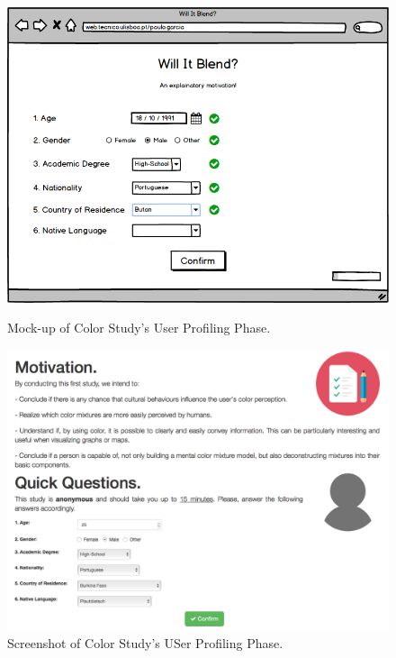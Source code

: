 \begin{figure}[htbp]
  \centering
  \begin{minipage}{0.4\textwidth}
		\centering
	  \includegraphics[width=\textwidth]{images/implementation/mockup_profiling.png}
	  \caption[Mock-up of Color Study's User Profiling Phase.]{Mock-up of Color Study's User Profiling Phase.}
	  \label{fig:mockup_profiling}
  \end{minipage}\hfill
  \begin{minipage}{0.4\textwidth}
		\centering
	  \includegraphics[width=\textwidth]{images/implementation/screen_profiling.png}
	  \caption[Screenshot of Color Study's User Profiling Phase.]{Screenshot of Color Study's USer Profiling Phase.}
	  \label{fig:screen_profiling}
  \end{minipage}
\end{figure}
